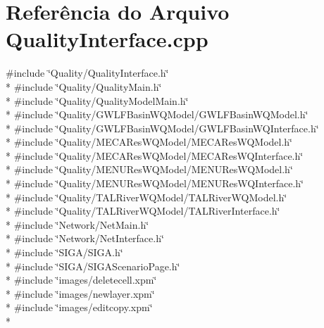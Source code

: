 \section{Referência do Arquivo Quality\+Interface.\+cpp}
\label{_quality_interface_8cpp}
{\ttfamily \#include \char`\"{}Quality/\+Quality\+Interface.\+h\char`\"{}}\\*
{\ttfamily \#include \char`\"{}Quality/\+Quality\+Main.\+h\char`\"{}}\\*
{\ttfamily \#include \char`\"{}Quality/\+Quality\+Model\+Main.\+h\char`\"{}}\\*
{\ttfamily \#include \char`\"{}Quality/\+G\+W\+L\+F\+Basin\+W\+Q\+Model/\+G\+W\+L\+F\+Basin\+W\+Q\+Model.\+h\char`\"{}}\\*
{\ttfamily \#include \char`\"{}Quality/\+G\+W\+L\+F\+Basin\+W\+Q\+Model/\+G\+W\+L\+F\+Basin\+W\+Q\+Interface.\+h\char`\"{}}\\*
{\ttfamily \#include \char`\"{}Quality/\+M\+E\+C\+A\+Res\+W\+Q\+Model/\+M\+E\+C\+A\+Res\+W\+Q\+Model.\+h\char`\"{}}\\*
{\ttfamily \#include \char`\"{}Quality/\+M\+E\+C\+A\+Res\+W\+Q\+Model/\+M\+E\+C\+A\+Res\+W\+Q\+Interface.\+h\char`\"{}}\\*
{\ttfamily \#include \char`\"{}Quality/\+M\+E\+N\+U\+Res\+W\+Q\+Model/\+M\+E\+N\+U\+Res\+W\+Q\+Model.\+h\char`\"{}}\\*
{\ttfamily \#include \char`\"{}Quality/\+M\+E\+N\+U\+Res\+W\+Q\+Model/\+M\+E\+N\+U\+Res\+W\+Q\+Interface.\+h\char`\"{}}\\*
{\ttfamily \#include \char`\"{}Quality/\+T\+A\+L\+River\+W\+Q\+Model/\+T\+A\+L\+River\+W\+Q\+Model.\+h\char`\"{}}\\*
{\ttfamily \#include \char`\"{}Quality/\+T\+A\+L\+River\+W\+Q\+Model/\+T\+A\+L\+River\+Interface.\+h\char`\"{}}\\*
{\ttfamily \#include \char`\"{}Network/\+Net\+Main.\+h\char`\"{}}\\*
{\ttfamily \#include \char`\"{}Network/\+Net\+Interface.\+h\char`\"{}}\\*
{\ttfamily \#include \char`\"{}S\+I\+G\+A/\+S\+I\+G\+A.\+h\char`\"{}}\\*
{\ttfamily \#include \char`\"{}S\+I\+G\+A/\+S\+I\+G\+A\+Scenario\+Page.\+h\char`\"{}}\\*
{\ttfamily \#include \char`\"{}images/deletecell.\+xpm\char`\"{}}\\*
{\ttfamily \#include \char`\"{}images/newlayer.\+xpm\char`\"{}}\\*
{\ttfamily \#include \char`\"{}images/editcopy.\+xpm\char`\"{}}\\*
